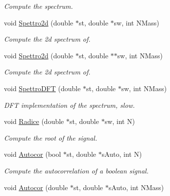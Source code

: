 \begin{DoxyCompactItemize}
\begin{DoxyCompactList}\small\item\em Compute the spectrum. \end{DoxyCompactList}\item 
void \hyperlink{classMatematica_a817fad189f184396efc334a2429fdf7a}{Spettro2d} (double $\ast$st, double $\ast$sw, int N\+Mass)
\begin{DoxyCompactList}\small\item\em Compute the 2d spectrum of. \end{DoxyCompactList}\item 
void \hyperlink{classMatematica_a4529a3aade5c9592905c7febebac662a}{Spettro2d} (double $\ast$st, double $\ast$$\ast$sw, int N\+Mass)
\begin{DoxyCompactList}\small\item\em Compute the 2d spectrum of. \end{DoxyCompactList}\item 
void \hyperlink{classMatematica_a8244ce9b83c8b38d0004086377ec137c}{Spettro\+D\+FT} (double $\ast$st, double $\ast$sw, int N\+Mass)\hypertarget{classMatematica_a8244ce9b83c8b38d0004086377ec137c}{}\label{classMatematica_a8244ce9b83c8b38d0004086377ec137c}

\begin{DoxyCompactList}\small\item\em D\+FT implementation of the spectrum, slow. \end{DoxyCompactList}\item 
void \hyperlink{classMatematica_aeac3632a9ced53cee7f0bda92208dd07}{Radice} (double $\ast$st, double $\ast$sw, int N)\hypertarget{classMatematica_aeac3632a9ced53cee7f0bda92208dd07}{}\label{classMatematica_aeac3632a9ced53cee7f0bda92208dd07}

\begin{DoxyCompactList}\small\item\em Compute the root of the signal. \end{DoxyCompactList}\item 
void \hyperlink{classMatematica_a6410e1f3b747f1e313e9d3bcffe004ce}{Autocor} (bool $\ast$st, double $\ast$s\+Auto, int N)\hypertarget{classMatematica_a6410e1f3b747f1e313e9d3bcffe004ce}{}\label{classMatematica_a6410e1f3b747f1e313e9d3bcffe004ce}

\begin{DoxyCompactList}\small\item\em Compute the autocorrelation of a boolean signal. \end{DoxyCompactList}\item 
void \hyperlink{classMatematica_af0661121d63e1dddda156d2e46b4c39d}{Autocor} (double $\ast$st, double $\ast$s\+Auto, int N\+Mass)\hypertarget{classMatematica_af0661121d63e1dddda156d2e46b4c39d}{}\label{classMatematica_af0661121d63e1dddda156d2e46b4c39d}


\end{DoxyCompactItemize}
